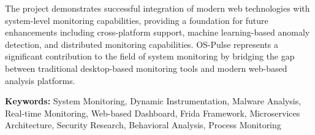 The project demonstrates successful integration of modern web technologies with system-level monitoring capabilities, providing a foundation for future enhancements including cross-platform support, machine learning-based anomaly detection, and distributed monitoring capabilities. OS-Pulse represents a significant contribution to the field of system monitoring by bridging the gap between traditional desktop-based monitoring tools and modern web-based analysis platforms.

\textbf{Keywords:} System Monitoring, Dynamic Instrumentation, Malware Analysis, Real-time Monitoring, Web-based Dashboard, Frida Framework, Microservices Architecture, Security Research, Behavioral Analysis, Process Monitoring